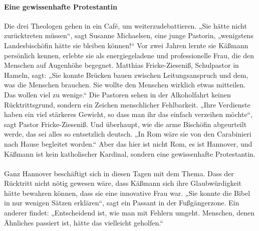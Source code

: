 \documentclass[a4paper,12pt,twoside]{scrbook}
\begin{document}
\paragraph{Eine gewissenhafte Protestantin}
Die drei Theologen gehen in ein Café, um weiterzudebattieren. „Sie hätte nicht zurücktreten müssen“, sagt Susanne Michaelsen, eine junge Pastorin, „wenigstens Landesbischöfin hätte sie bleiben können!“ Vor zwei Jahren lernte sie Käßmann persönlich kennen, erlebte sie als energiegeladene und professionelle Frau, die den Menschen auf Augenhöhe begegnet. Matthias Fricke-Zieseniß, Schulpastor in Hameln, sagt: „Sie konnte Brücken bauen zwischen Leitungsanspruch und dem, was die Menschen brauchen. Sie wollte den Menschen wirklich etwas mitteilen. Das wollen viel zu wenige.“ Die Pastoren sehen in der Alkoholfahrt keinen Rücktrittsgrund, sondern ein Zeichen menschlicher Fehlbarkeit. „Ihre Verdienste haben ein viel stärkeres Gewicht, so dass man ihr das einfach verzeihen möchte“, sagt Pastor Fricke-Zieseniß. Und überhaupt, wie die arme Bischöfin abgeurteilt werde, das sei alles so entsetzlich deutsch. „In Rom wäre sie von den Carabinieri nach Hause begleitet worden.“ Aber das hier ist nicht Rom, es ist Hannover, und Käßmann ist kein katholischer Kardinal, sondern eine gewissenhafte Protestantin.
\\\\
Ganz Hannover beschäftigt sich in diesen Tagen mit dem Thema. Dass der Rücktritt nicht nötig gewesen wäre, dass Käßmann sich ihre Glaubwürdigkeit hätte bewahren können, dass sie eine innovative Frau war. „Sie konnte die Bibel in nur wenigen Sätzen erklären“, sagt ein Passant in der Fußgängerzone. Ein anderer findet: „Entscheidend ist, wie man mit Fehlern umgeht. Menschen, denen Ähnliches passiert ist, hätte das vielleicht geholfen.“
\end{document}
